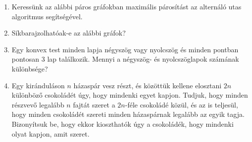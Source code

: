\documentclass[a4paper, 12pt]{article}
\begin{document}
        \noindent{}
        \noindent{}
        
        
        \begin{enumerate}
            \item Keressünk az alábbi páros gráfokban maximális párosítást az alternáló utas algoritmus segítségével.
            \begin{figure}[!ht]
                \centering
                \begin{subfigure}{0.48\textwidth}
                    \centering
                    
                \end{subfigure}
                \begin{subfigure}{0.48\textwidth}
                    \centering
                    
                \end{subfigure}
            \end{figure}
            \item Síkbarajzolhatóak-e az alábbi gráfok?
            \begin{figure}[!ht]
                \centering
                
                
                
                
                
                
            \end{figure}
            \item Egy konvex test minden lapja négyszög vagy nyolcszög és minden pontban pontosan $3$ lap találkozik. Mennyi a négyszög- és nyolcszöglapok számának különbsége?
            \item Egy kiránduláson $n$ házaspár vesz részt, és közöttük kellene elosztani $2n$ különböző csokoládét úgy, hogy mindenki egyet kapjon. Tudjuk, hogy minden részvevő legalább $n$ fajtát szeret a $2n$-féle csokoládé közül, és az is teljesül, hogy minden csokoládét szereti minden házaspárnak legalább az egyik tagja. Bizonyítsuk be, hogy ekkor kioszthatók úgy a csokoládék, hogy mindenki olyat kapjon, amit szeret.

\end{enumerate}
\end{document}

